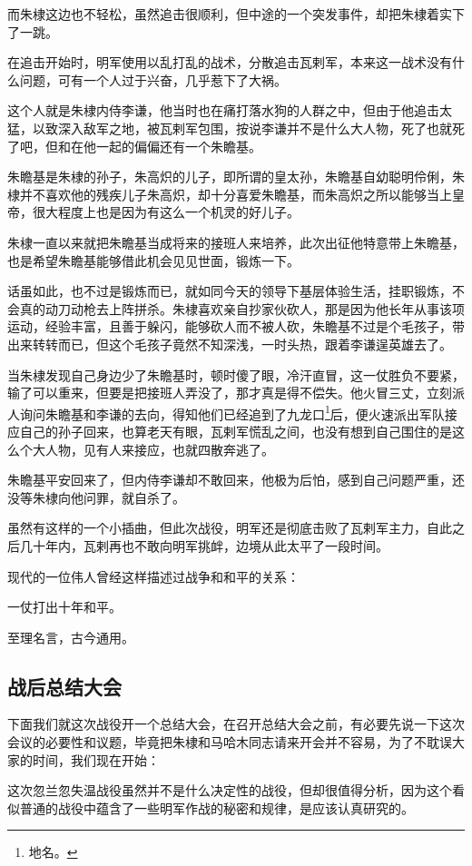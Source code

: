 \begin{multicols}{\theparacolNo}
而朱棣这边也不轻松，虽然追击很顺利，但中途的一个突发事件，却把朱棣着实下了一跳。

在追击开始时，明军使用以乱打乱的战术，分散追击瓦剌军，本来这一战术没有什么问题，可有一个人过于兴奋，几乎惹下了大祸。

这个人就是朱棣内侍李谦，他当时也在痛打落水狗的人群之中，但由于他追击太猛，以致深入敌军之地，被瓦剌军包围，按说李谦并不是什么大人物，死了也就死了吧，但和在他一起的偏偏还有一个朱瞻基。

朱瞻基是朱棣的孙子，朱高炽的儿子，即所谓的皇太孙，朱瞻基自幼聪明伶俐，朱棣并不喜欢他的残疾儿子朱高炽，却十分喜爱朱瞻基，而朱高炽之所以能够当上皇帝，很大程度上也是因为有这么一个机灵的好儿子。

朱棣一直以来就把朱瞻基当成将来的接班人来培养，此次出征他特意带上朱瞻基，也是希望朱瞻基能够借此机会见见世面，锻炼一下。

话虽如此，也不过是锻炼而已，就如同今天的领导下基层体验生活，挂职锻炼，不会真的动刀动枪去上阵拼杀。朱棣喜欢亲自抄家伙砍人，那是因为他长年从事该项运动，经验丰富，且善于躲闪，能够砍人而不被人砍，朱瞻基不过是个毛孩子，带出来转转而已，但这个毛孩子竟然不知深浅，一时头热，跟着李谦逞英雄去了。

当朱棣发现自己身边少了朱瞻基时，顿时傻了眼，冷汗直冒，这一仗胜负不要紧，输了可以重来，但要是把接班人弄没了，那才真是得不偿失。他火冒三丈，立刻派人询问朱瞻基和李谦的去向，得知他们已经追到了九龙口\footnote{地名。}后，便火速派出军队接应自己的孙子回来，也算老天有眼，瓦剌军慌乱之间，也没有想到自己围住的是这么个大人物，见有人来接应，也就四散奔逃了。

朱瞻基平安回来了，但内侍李谦却不敢回来，他极为后怕，感到自己问题严重，还没等朱棣向他问罪，就自杀了。

虽然有这样的一个小插曲，但此次战役，明军还是彻底击败了瓦剌军主力，自此之后几十年内，瓦剌再也不敢向明军挑衅，边境从此太平了一段时间。

现代的一位伟人曾经这样描述过战争和和平的关系：

一仗打出十年和平。

至理名言，古今通用。

\subsection{战后总结大会}
下面我们就这次战役开一个总结大会，在召开总结大会之前，有必要先说一下这次会议的必要性和议题，毕竟把朱棣和马哈木同志请来开会并不容易，为了不耽误大家的时间，我们现在开始：

这次忽兰忽失温战役虽然并不是什么决定性的战役，但却很值得分析，因为这个看似普通的战役中蕴含了一些明军作战的秘密和规律，是应该认真研究的。


\end{multicols}
